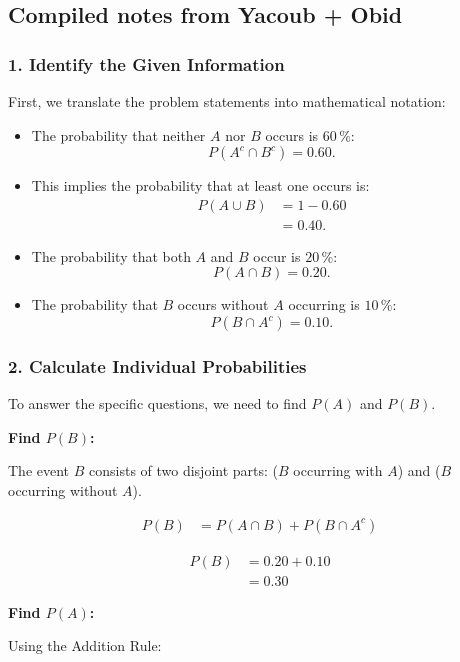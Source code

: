 \documentclass[10pt]{article}
\begin{document}
\subsection*{Compiled notes from Yacoub + Obid}

\subsubsection*{1. Identify the Given Information}
First, we translate the problem statements into
mathematical notation:

\begin{itemize}
\item The probability that neither $A$ nor $B$ occurs is
$60\,\%$:
\[
P(A^c \cap B^c)=0.60.
\]

\item This implies the probability that at least one occurs is:
\begin{align*}
P(A \cup B)
&= 1-0.60 \\[2mm]
&= 0.40.
\end{align*}

\item The probability that both $A$ and $B$ occur is
$20\,\%$:
\[
P(A \cap B)=0.20.
\]

\item The probability that $B$ occurs without $A$ occurring is
$10\,\%$:
\[
P(B \cap A^c)=0.10.
\]
\end{itemize}

\subsubsection*{2. Calculate Individual Probabilities}
To answer the specific questions, we need to find
$P(A)$ and $P(B)$.

\textbf{Find $P(B)$:}

The event $B$ consists of two disjoint parts:
($B$ occurring with $A$) and ($B$ occurring without $A$).

\begin{align*}
P(B)
&= P(A \cap B)
   + P(B \cap A^c)
\end{align*}

\begin{align*}
P(B)
&= 0.20+0.10 \\[2mm]
&= 0.30
\end{align*}

\textbf{Find $P(A)$:}

Using the Addition Rule:
\end{document}
